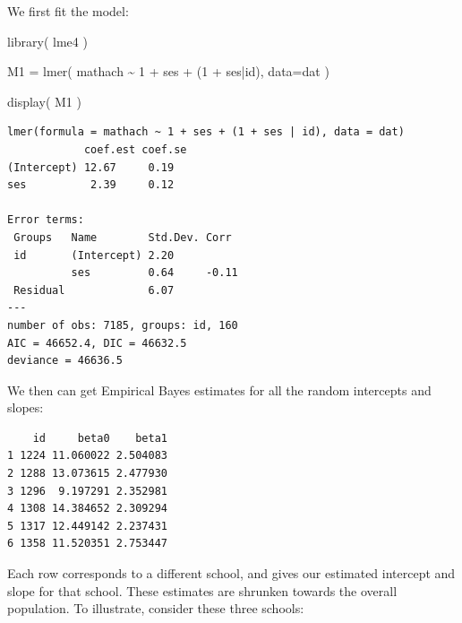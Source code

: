 \documentclass[
  letterpaper,
  DIV=11,
  numbers=noendperiod]{scrreprt}
\newenvironment{Shaded}{}{}
\newcommand{\AttributeTok}[1]{\textcolor[rgb]{0.49,0.56,0.16}{#1}}
\newcommand{\DecValTok}[1]{\textcolor[rgb]{0.25,0.63,0.44}{#1}}
\newcommand{\FunctionTok}[1]{\textcolor[rgb]{0.02,0.16,0.49}{#1}}
\newcommand{\NormalTok}[1]{#1}
\newcommand{\OtherTok}[1]{\textcolor[rgb]{0.00,0.44,0.13}{#1}}
\newcommand{\SpecialCharTok}[1]{\textcolor[rgb]{0.25,0.44,0.63}{#1}}
\newcommand{\StringTok}[1]{\textcolor[rgb]{0.25,0.44,0.63}{#1}}
\begin{document}
We first fit the model:

\begin{Shaded}
\begin{Highlighting}[]
\FunctionTok{library}\NormalTok{( lme4 )}

\NormalTok{M1 }\OtherTok{=} \FunctionTok{lmer}\NormalTok{( mathach }\SpecialCharTok{\textasciitilde{}} \DecValTok{1} \SpecialCharTok{+}\NormalTok{ ses }\SpecialCharTok{+}\NormalTok{ (}\DecValTok{1} \SpecialCharTok{+}\NormalTok{ ses}\SpecialCharTok{|}\NormalTok{id), }\AttributeTok{data=}\NormalTok{dat )}

\FunctionTok{display}\NormalTok{( M1 )}
\end{Highlighting}
\end{Shaded}

\begin{verbatim}
lmer(formula = mathach ~ 1 + ses + (1 + ses | id), data = dat)
            coef.est coef.se
(Intercept) 12.67     0.19  
ses          2.39     0.12  

Error terms:
 Groups   Name        Std.Dev. Corr  
 id       (Intercept) 2.20           
          ses         0.64     -0.11 
 Residual             6.07           
---
number of obs: 7185, groups: id, 160
AIC = 46652.4, DIC = 46632.5
deviance = 46636.5 
\end{verbatim}

We then can get Empirical Bayes estimates for all the random intercepts
and slopes:

\begin{Shaded}
\end{Shaded}

\begin{verbatim}
    id     beta0    beta1
1 1224 11.060022 2.504083
2 1288 13.073615 2.477930
3 1296  9.197291 2.352981
4 1308 14.384652 2.309294
5 1317 12.449142 2.237431
6 1358 11.520351 2.753447
\end{verbatim}

Each row corresponds to a different school, and gives our estimated
intercept and slope for that school. These estimates are shrunken
towards the overall population. To illustrate, consider these three
schools:
\end{document}
